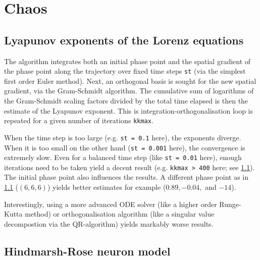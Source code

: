 \graphicspath{{../figures/5/}}


\chapter{Chaos}



\section{Lyapunov exponents of the Lorenz equations}
\label{sec:lorenz}

The algorithm integrates both an initial phase point and the spatial gradient of the phase point along the trajectory over fixed time steps \texttt{st} (via the simplest first order Euler method). Next, an orthogonal basis is sought for the new spatial gradient, via the Gram-Schmidt algorithm. The cumulative sum of logarithms of the Gram-Schmidt scaling factors divided by the total time elapsed is then the estimate of the Lyapunov exponent. This is integration-orthogonalisation loop is repeated for a given number of iterations \texttt{kkmax}.

When the time step is too large (e.g. \texttt{st = 0.1} here), the exponents diverge. When it is too small on the other hand (\texttt{st = 0.001} here), the convergence is extremely slow. Even for a balanced time step (like \texttt{st = 0.01} here), enough iterations need to be taken yield a decent result (e.g. \texttt{kkmax > 400} here; see \cref{fig:LE_Lorenz}). The initial phase point also influences the results. A different phase point as in \cref{fig:LE_Lorenz} ($(6,6,6)$) yields better estimates for example ($0.89, -0.04, $ and $-14$).

Interestingly, using a more advanced ODE solver (like a higher order Runge-Kutta method) or orthogonalisation algorithm (like a singular value decompostion via the QR-algorithm) yields markably worse results.


\begin{figure}
\label{fig:LE_Lorenz}
\end{figure}






\section{Hindmarsh-Rose neuron model}

